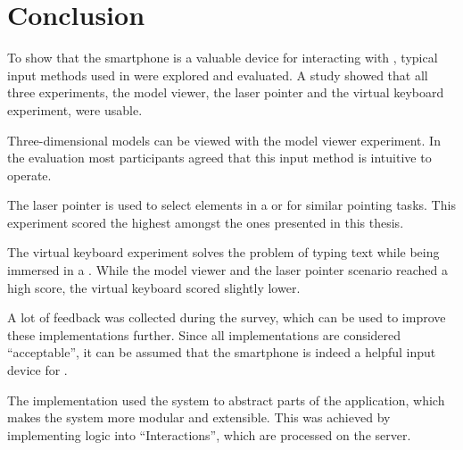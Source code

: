 \chapter{Conclusion}\label{chapter:conclusion}

To show that the smartphone is a valuable device for interacting with , typical input methods used in  were explored and evaluated. A  study showed that all three experiments, the model viewer, the laser pointer and the virtual keyboard experiment, were usable. %

Three-dimensional models can be viewed with the model viewer experiment. In the evaluation most participants agreed that this input method is intuitive to operate.

The laser pointer is used to select elements in a  or for similar pointing tasks. This experiment scored the highest amongst the ones presented in this thesis. 

The virtual keyboard experiment solves the problem of typing text while being immersed in a . While the model viewer and the laser pointer scenario reached a high score, the virtual keyboard scored slightly lower. 

A lot of feedback was collected during the survey, which can be used to improve these implementations further. Since all implementations are considered \enquote{acceptable}, it can be assumed that the smartphone is indeed a helpful input device for .

The implementation used the  system to abstract parts of the application, which makes the system more modular and extensible. This was achieved by implementing logic into \enquote{Interactions}, which are processed on the server. 